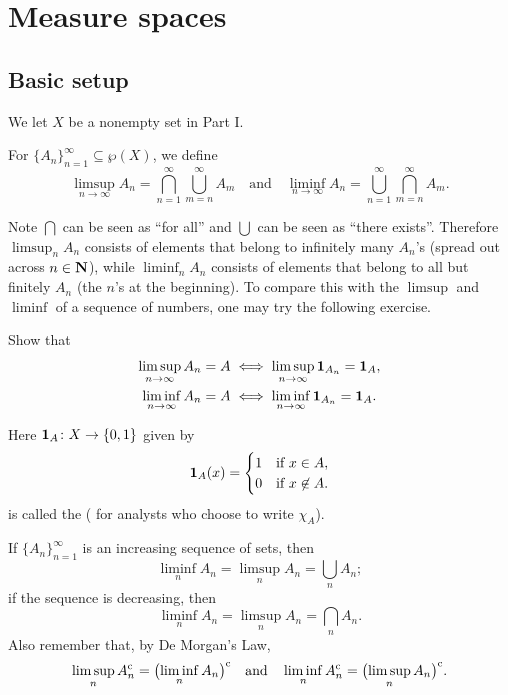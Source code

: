 \chapter{Measure spaces}
\section{Basic setup}
We let $X$ be a nonempty set in Part I.
\begin{defn}
    For $\{A_n\}_{n=1}^\infty\subseteq \wp(X)$, we define \[
        \limsup_{n \to \infty} A_n = \bigcap_{n=1}^\infty \bigcup_{m=n}^\infty A_m \quad \text{and}\quad \liminf_{n \to \infty} A_n = \bigcup_{n = 1}^\infty \bigcap_{m = n}^\infty A_m.
    \]
\end{defn}
Note $\bigcap$ can be seen as ``for all'' and $\bigcup$ can be seen as ``there exists''. Therefore $\limsup_n A_n$ consists of elements that belong to infinitely many $A_n$'s (spread out across $n \in \mathbf{N}$), while $\liminf_n A_n$ consists of elements that belong to all but finitely $A_n$ (the $n$'s at the beginning). To compare this with the $\limsup$ and $\liminf$ of a sequence of numbers, one may try the following exercise.

\begin{xca}
    Show that \begin{align*}
        \limsup_{n \to \infty}  A_n = A & \iff \limsup_{n \to \infty} \mathbf{1}_{A_n} = \mathbf{1}_A, \\
        \liminf_{n \to \infty}  A_n = A & \iff \liminf_{n \to \infty} \mathbf{1}_{A_n} = \mathbf{1}_A.
    \end{align*}

    Here $\mathbf{1}_A\colon X \to \{0,1\}$ given by \[
        \mathbf{1}_A(x)= \begin{cases}
            1 & \text{if } x \in A, \\
            0 & \text{if } x \not\in A.
        \end{cases}
    \]
    is called the  ( for analysts who choose to write $\chi_A$).
\end{xca}

If $\{A_n\}_{n=1}^\infty$ is an increasing sequence of sets, then \[
    \liminf_n A_n = \limsup_n A_n = \bigcup_n A_n;
\] if the sequence is decreasing, then \[
    \liminf_n A_n = \limsup_n A_n = \bigcap_n A_n.
\] Also remember that, by De Morgan's Law, \[
    \limsup_n A_n^{\mathrm{c}} = \bigl(\liminf_n A_n\bigr)^{\mathrm{c}} \quad \text{and}\quad 
    \liminf_n A_n^{\mathrm{c}} = \bigl(\limsup_n A_n \bigr)^{\mathrm{c}}.
\]

